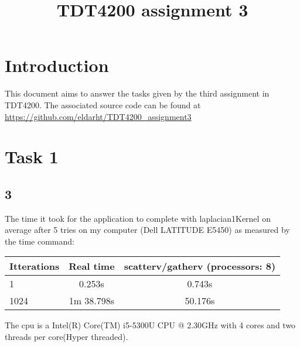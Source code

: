 \documentclass{article}
\title{TDT4200 assignment 3}
\begin{document}
\maketitle
\section*{Introduction}
This document aims to answer the tasks given by the third assignment in TDT4200.
The associated source code can be found at \url{https://github.com/eldarht/TDT4200_assignment3}

\section*{Task 1}
\subsection*{3}
The time it took for the application to complete with laplacian1Kernel on average after 5 tries on my computer (Dell LATITUDE E5450) as measured by the time command:

\begin{tabular}{|l|c|c}
	Itterations & Real time  & scatterv/gatherv (processors: 8)\\
	\hline
	1			& 0.253s	 & 0.743s	\\
	1024		& 1m 38.798s & 50.176s	\\
\end{tabular}

The cpu is a Intel(R) Core(TM) i5-5300U CPU @ 2.30GHz with 4 cores and two threads per core(Hyper threaded).
\end{document}
